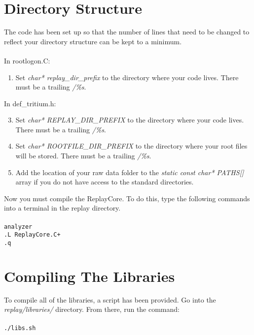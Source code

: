 \documentclass{report}
\begin{document}
\section{Directory Structure}
The code has been set up so that the number of lines that need to be changed to reflect your directory structure can be kept to a minimum.
\\\\
\noindent In rootlogon.C:
\begin{enumerate}
\item Set \textit{char* replay\_dir\_prefix} to the directory where your code lives. There must be a trailing \textit{/\%s}.
\end{enumerate}
In def\_tritium.h:
\begin{enumerate}
\setcounter{enumi}{2}
\item Set \textit{char* REPLAY\_DIR\_PREFIX} to the directory where your code lives. There must be a trailing \textit{/\%s}.
\item Set \textit{char* ROOTFILE\_DIR\_PREFIX} to the directory where your root files will be stored. There must be a trailing \textit{/\%s}.
\item Add the location of your raw data folder to the \textit{static const char* PATHS[]} array if you do not have access to the standard directories.
\end{enumerate}

Now you must compile the ReplayCore. To do this, type the following commands into a terminal in the replay directory.
\\\\
\texttt{analyzer\\
.L ReplayCore.C+\\
.q}

\section{Compiling The Libraries}

To compile all of the libraries, a script has been provided. Go into the \textit{replay/libraries/} directory. From there, run the command:\\\\
\texttt{./libs.sh}
\end{document}
